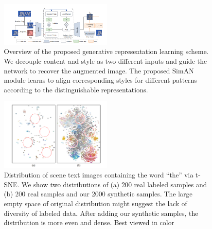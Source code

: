 \documentclass{article}
\begin{document}
\begin{figure}
    \centering
    \includegraphics[width=0.5\textwidth]{f2.PNG}
    \caption
    {
        Overview of the proposed generative representation learning scheme. We decouple content and style as two different inputs and
        guide the network to recover the augmented image. The proposed SimAN module learns to align corresponding styles for different patterns
        according to the distinguishable representations.
    }
    
    \label{fig:my_figure2}
\end{figure}

\setcounter{figure}{4}

\begin{figure}
    \centering
    \includegraphics[width=0.5\textwidth]{f5.PNG}
    \caption
    { 
        Distribution of scene text images containing the word
        “the” via t-SNE. We show two distributions of (a) 200 real labeled
        samples and (b) 200 real samples and our 2000 synthetic samples.
        The large empty space of original distribution might suggest the
        lack of diversity of labeled data. After adding our synthetic samples, the distribution is more even and dense. Best viewed in color
    }
    \label{fig:my_figure5}
\end{figure}



\end{document}
